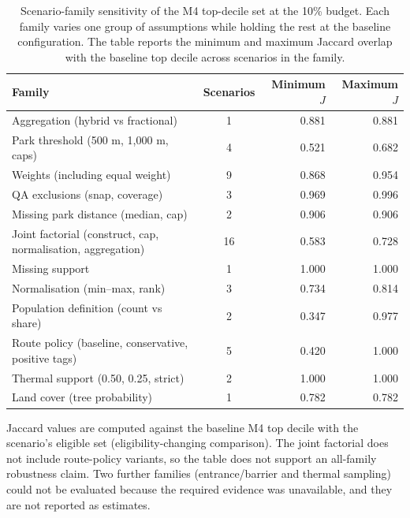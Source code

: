 \begin{table}[htbp]
\centering
\small
\caption{Scenario-family sensitivity of the M4 top-decile set at the 10\% budget.
Each family varies one group of assumptions while holding the rest at the baseline
configuration. The table reports the minimum and maximum Jaccard overlap with the
baseline top decile across scenarios in the family.}
\label{tab:sensitivity}
\begin{threeparttable}
\begin{tabular}{@{}lcrr@{}}
\toprule
Family & Scenarios & Minimum $J$ & Maximum $J$ \\
\midrule
Aggregation (hybrid vs fractional) & 1 & 0.881 & 0.881 \\
Park threshold (500 m, 1,000 m, caps) & 4 & 0.521 & 0.682 \\
Weights (including equal weight) & 9 & 0.868 & 0.954 \\
QA exclusions (snap, coverage) & 3 & 0.969 & 0.996 \\
Missing park distance (median, cap) & 2 & 0.906 & 0.906 \\
Joint factorial (construct, cap, normalisation, aggregation) & 16 & 0.583 & 0.728 \\
Missing support & 1 & 1.000 & 1.000 \\
Normalisation (min--max, rank) & 3 & 0.734 & 0.814 \\
Population definition (count vs share) & 2 & 0.347 & 0.977 \\
Route policy (baseline, conservative, positive tags) & 5 & 0.420 & 1.000 \\
Thermal support (0.50, 0.25, strict) & 2 & 1.000 & 1.000 \\
Land cover (tree probability) & 1 & 0.782 & 0.782 \\
\bottomrule
\end{tabular}
\begin{tablenotes}[flushleft]\footnotesize
\item Jaccard values are computed against the baseline M4 top decile with the scenario's eligible set (eligibility-changing comparison). The joint factorial does not include route-policy variants, so the table does not support an all-family robustness claim. Two further families (entrance/barrier and thermal sampling) could not be evaluated because the required evidence was unavailable, and they are not reported as estimates.
\end{tablenotes}
\end{threeparttable}
\end{table}
